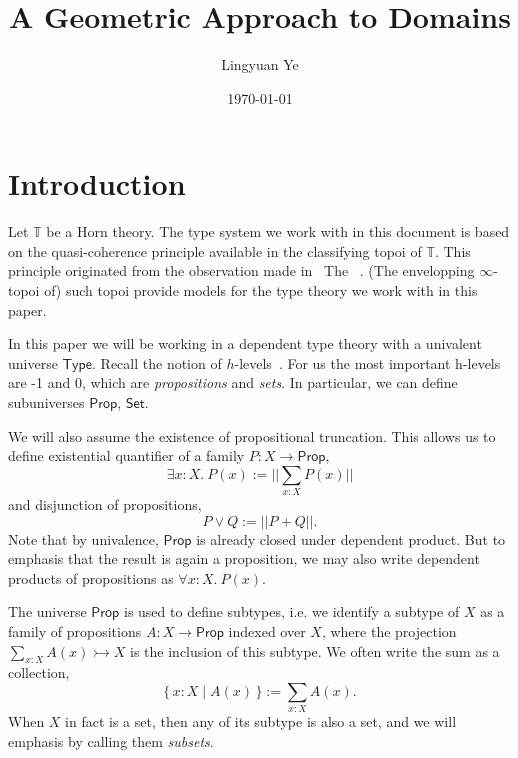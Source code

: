 \documentclass[12pt]{amsart}
\title{A Geometric Approach to Domains}
\author{Lingyuan Ye}
\date{\today}
\theoremstyle{definition}
\newcommand{\mbb}[1]{\mathbb{#1}}
\newcommand{\T}{\mbb T}
\newcommand{\ms}[1]{\mathsf{#1}}
\newcommand{\scomp}[2]{\{\,#1\mid#2\,\}}
\newcommand{\inj}{\rightarrowtail}
\newcommand{\fa}[2]{\forall #1\!\colon\!\!#2.\ }
\newcommand{\ex}[2]{\exists #1\!\colon\!\!#2.\ }
\newcommand{\pss}[1]{||#1||} %
\newcommand{\tp}{\ms{Type}}
\newcommand{\pp}{\ms{Prop}}
\newcommand{\st}{\ms{Set}}
\begin{document}
%

%
%

%
%

%
\maketitle              %
%
\tableofcontents

\section{Introduction}

Let $\T$ be a Horn theory. The type system we work with in this document is based on the quasi-coherence principle available in the classifying topoi of $\T$. This principle originated from the observation made in~\cite{RN879} The  ~\cite{blechschmidt2021using,blechschmidt2020general}. (The envelopping $\infty$-topoi of) such topoi provide models for the type theory we work with in this paper.

In this paper we will be working in a dependent type theory with a univalent universe $\tp$. Recall the notion of $h$-levels~\cite{hottbook}. For us the most important h-levels are -1 and 0, which are \emph{propositions} and \emph{sets}. In particular, we can define subuniverses $\pp$, $\st$.

We will also assume the existence of propositional truncation. This allows us to define existential quantifier of a family $P : X \to \pp$, 
\[ \ex x{X} P(x) := \pss{\sum_{x:X}P(x)} \] 
and disjunction of propositions,
\[ P \vee Q := \pss{P + Q}. \]
Note that by univalence, $\pp$ is already closed under dependent product. But to emphasis that the result is again a proposition, we may also write dependent products of propositions as $\fa xX P(x)$. 

The universe $\pp$ is used to define subtypes, i.e. we identify a subtype of $X$ as a family of propositions $A : X \to \pp$ indexed over $X$, where the projection $\sum_{x:X}A(x) \inj X$ is the inclusion of this subtype. We often write the sum as a collection,
\[ \scomp{x:X}{A(x)} := \sum_{x:X}A(x). \]
When $X$ in fact is a set, then any of its subtype is also a set, and we will emphasis by calling them \emph{subsets}.
\end{document}
